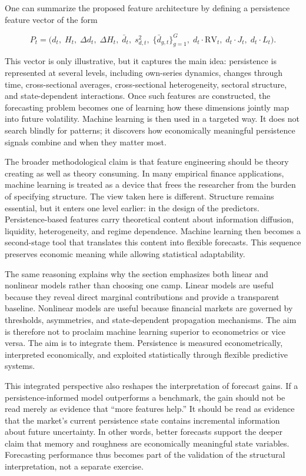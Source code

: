 \documentclass[12pt]{article}
\begin{document}
One can summarize the proposed feature architecture by defining a persistence feature vector of the form

\[P_t = \bigl(d_t,\; H_t,\; \Delta d_t,\; \Delta H_t,\; \bar{d}_t,\; s_{d,t}^2,\; \{\bar{d}_{g,t}\}_{g=1}^{G},\; d_t \cdot \mathrm{RV}_t,\; d_t \cdot J_t,\; d_t \cdot L_t\bigr).\]

This vector is only illustrative, but it captures the main idea: persistence is represented at several levels, including own-series dynamics, changes through time, cross-sectional averages, cross-sectional heterogeneity, sectoral structure, and state-dependent interactions. Once such features are constructed, the forecasting problem becomes one of learning how these dimensions jointly map into future volatility. Machine learning is then used in a targeted way. It does not search blindly for patterns; it discovers how economically meaningful persistence signals combine and when they matter most.

The broader methodological claim is that feature engineering should be theory creating as well as theory consuming. In many empirical finance applications, machine learning is treated as a device that frees the researcher from the burden of specifying structure. The view taken here is different. Structure remains essential, but it enters one level earlier: in the design of the predictors. Persistence-based features carry theoretical content about information diffusion, liquidity, heterogeneity, and regime dependence. Machine learning then becomes a second-stage tool that translates this content into flexible forecasts. This sequence preserves economic meaning while allowing statistical adaptability.

The same reasoning explains why the section emphasizes both linear and nonlinear models rather than choosing one camp. Linear models are useful because they reveal direct marginal contributions and provide a transparent baseline. Nonlinear models are useful because financial markets are governed by thresholds, asymmetries, and state-dependent propagation mechanisms. The aim is therefore not to proclaim machine learning superior to econometrics or vice versa. The aim is to integrate them. Persistence is measured econometrically, interpreted economically, and exploited statistically through flexible predictive systems.

This integrated perspective also reshapes the interpretation of forecast gains. If a persistence-informed model outperforms a benchmark, the gain should not be read merely as evidence that ``more features help.'' It should be read as evidence that the market's current persistence state contains incremental information about future uncertainty. In other words, better forecasts support the deeper claim that memory and roughness are economically meaningful state variables. Forecasting performance thus becomes part of the validation of the structural interpretation, not a separate exercise.
\end{document}

